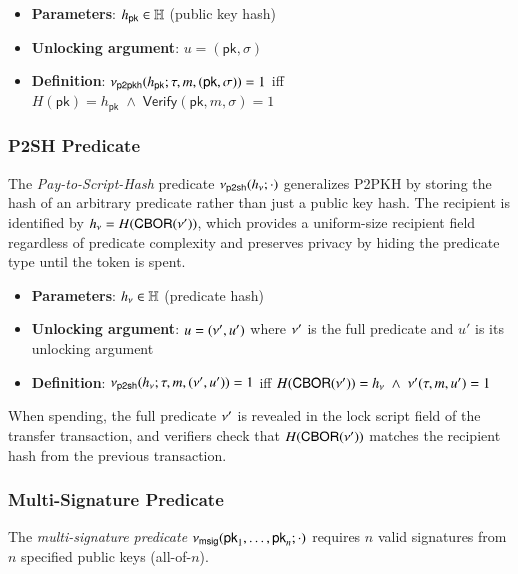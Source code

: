\begin{itemize}
	\item \textbf{Parameters}: $h_\mathsf{pk} \in \mathbb{H}$ (public key hash)
	\item \textbf{Unlocking argument}: $u = (\mathsf{pk}, \sigma)$
	\item \textbf{Definition}: $\nu_\mathsf{p2pkh}(h_\mathsf{pk}; \tau, m, (\mathsf{pk}, \sigma)) = 1$ iff $H(\mathsf{pk}) = h_\mathsf{pk} \;\land\; \mathsf{Verify}(\mathsf{pk}, m, \sigma) = 1$
\end{itemize}

\subsubsection{P2SH Predicate}\label{sec:p2sh}

The \emph{Pay-to-Script-Hash} predicate $\nu_\mathsf{p2sh}(h_\nu;\cdot)$ generalizes P2PKH by storing the hash of an arbitrary predicate rather than just a public key hash. The recipient is identified by $h_\nu = H(\mathsf{CBOR}(\nu'))$, which provides a uniform-size recipient field regardless of predicate complexity and preserves privacy by hiding the predicate type until the token is spent.

\begin{itemize}
	\item \textbf{Parameters}: $h_\nu \in \mathbb{H}$ (predicate hash)
	\item \textbf{Unlocking argument}: $u = (\nu', u')$ where $\nu'$ is the full predicate and $u'$ is its unlocking argument
	\item \textbf{Definition}: $\nu_\mathsf{p2sh}(h_\nu; \tau, m, (\nu', u')) = 1$ iff $H(\mathsf{CBOR}(\nu')) = h_\nu \;\land\; \nu'(\tau, m, u') = 1$
\end{itemize}

When spending, the full predicate $\nu'$ is revealed in the lock script field of the transfer transaction, and verifiers check that $H(\mathsf{CBOR}(\nu'))$ matches the recipient hash from the previous transaction.

\subsubsection{Multi-Signature Predicate}

The \emph{multi-signature predicate} $\nu_\mathsf{msig}(\mathsf{pk}_1, \ldots, \mathsf{pk}_n;\cdot)$ requires $n$ valid signatures from $n$ specified public keys (all-of-$n$).

